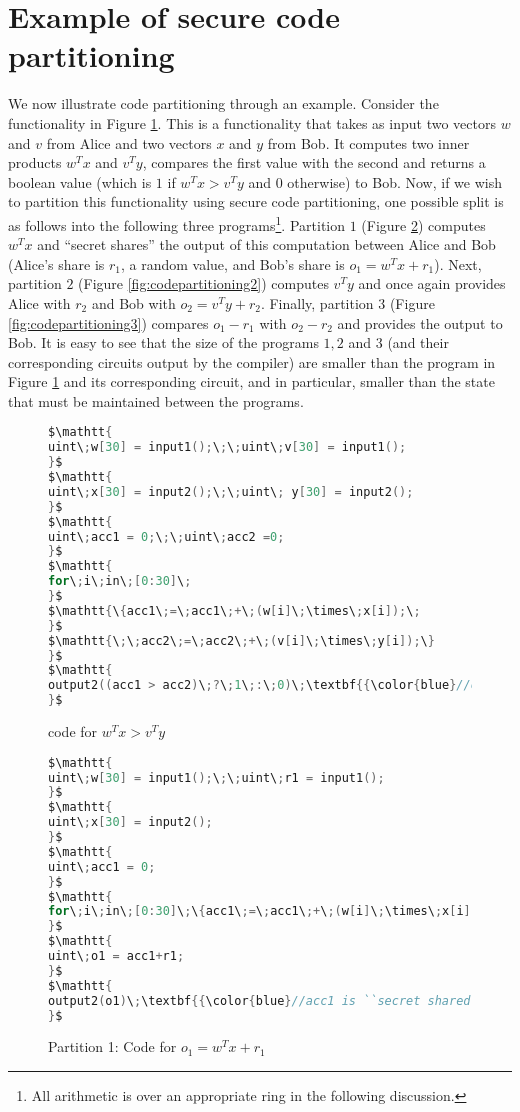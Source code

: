 \section{Example of secure code partitioning}\label{app:codepartitioning}
We now illustrate code partitioning through an example. Consider the functionality in Figure \ref{fig:largecode}. This is a functionality that takes as input two vectors $w$ and $v$ from Alice and two vectors $x$ and $y$ from Bob. It computes two inner products $w^Tx$ and $v^Ty$, compares the first value with the second and returns a boolean value (which is $1$ if $w^Tx>v^Ty$ and $0$ otherwise) to Bob. Now, if we wish to partition this functionality using secure code partitioning, one possible split is as follows into the following three programs\footnote{All arithmetic is over an appropriate ring in the following discussion.}. Partition $1$ (Figure \ref{fig:codepartitioning1}) computes $w^Tx$ and ``secret shares'' the output of this computation between Alice and Bob (Alice's share is $r_1$, a random value, and Bob's share is $o_1 = w^Tx+r_1$). Next, partition $2$ (Figure \ref{fig:codepartitioning2}) computes $v^Ty$ and once again provides Alice with $r_2$ and Bob with $o_2 = v^Ty+r_2$. Finally, partition $3$ (Figure \ref{fig:codepartitioning3}) compares $o_1-r_1$ with $o_2-r_2$ and provides the output to Bob. It is easy to see that the size of the programs $1, 2$ and $3$ (and their corresponding circuits output by the \tool compiler) are smaller than the program in Figure \ref{fig:largecode} and its corresponding circuit, and in particular, smaller than the state that must be maintained between the programs.

\begin{figure}
\begin{lstlisting}[language=C,mathescape=true]
$\mathtt{
uint\;w[30] = input1();\;\;uint\;v[30] = input1();
}$
$\mathtt{
uint\;x[30] = input2();\;\;uint\; y[30] = input2();
}$
$\mathtt{
uint\;acc1 = 0;\;\;uint\;acc2 =0;
}$
$\mathtt{
for\;i\;in\;[0:30]\;
}$
$\mathtt{\{acc1\;=\;acc1\;+\;(w[i]\;\times\;x[i]);\;
}$
$\mathtt{\;\;acc2\;=\;acc2\;+\;(v[i]\;\times\;y[i]);\}
}$
$\mathtt{
output2((acc1 > acc2)\;?\;1\;:\;0)\;\textbf{{\color{blue}//only to party 2}}
}$
\end{lstlisting}
\caption{\tool code for $w^Tx > v^Ty$}
\label{fig:largecode}
\end{figure}

\begin{figure}
\begin{lstlisting}[language=C,mathescape=true]
$\mathtt{
uint\;w[30] = input1();\;\;uint\;r1 = input1();
}$
$\mathtt{
uint\;x[30] = input2();
}$
$\mathtt{
uint\;acc1 = 0;
}$
$\mathtt{
for\;i\;in\;[0:30]\;\{acc1\;=\;acc1\;+\;(w[i]\;\times\;x[i]);\}
}$
$\mathtt{
uint\;o1 = acc1+r1;
}$
$\mathtt{
output2(o1)\;\textbf{{\color{blue}//acc1 is ``secret shared''}}
}$
\end{lstlisting}
\caption{Partition 1: Code for $o_1 = w^Tx+r_1$}
\label{fig:codepartitioning1}
\end{figure}

